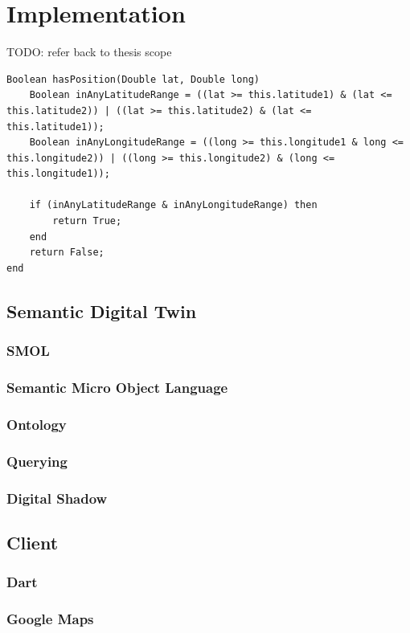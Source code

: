 \documentclass{article}
\begin{document}
\newpage
\section{Implementation}\label{sec:Implementation}

TODO: refer back to thesis scope
\begin{lstlisting}
Boolean hasPosition(Double lat, Double long)
    Boolean inAnyLatitudeRange = ((lat >= this.latitude1) & (lat <= this.latitude2)) | ((lat >= this.latitude2) & (lat <= this.latitude1));
    Boolean inAnyLongitudeRange = ((long >= this.longitude1 & long <= this.longitude2)) | ((long >= this.longitude2) & (long <= this.longitude1));

    if (inAnyLatitudeRange & inAnyLongitudeRange) then
        return True;
    end
    return False;
end
\end{lstlisting}


\subsection{Semantic Digital Twin}
\subsubsection{SMOL}
\subsubsection{Semantic Micro Object Language}
\subsubsection{Ontology}
\subsubsection{Querying}
\subsubsection{Digital Shadow}
\subsection{Client}
\subsubsection{Dart}
\subsubsection{Google Maps}
\end{document}
